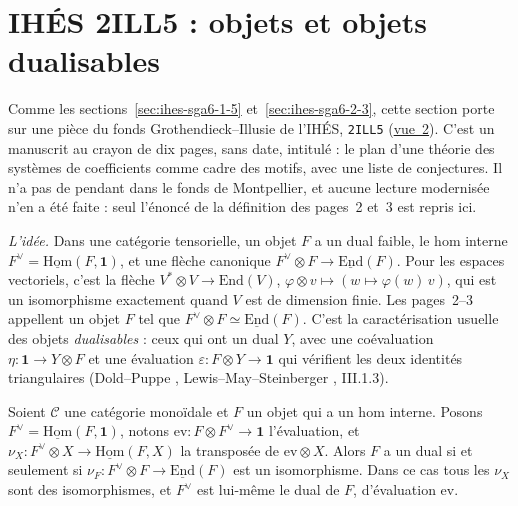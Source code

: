 \section[IHÉS 2ILL5 : objets \q{sereins} et objets dualisables]{IHÉS 2ILL5 : objets  et objets dualisables\protect{}}\label{sec:ihes-2ill5}

Comme les sections~\ref{sec:ihes-sga6-1-5} et~\ref{sec:ihes-sga6-2-3}, cette section porte sur une pièce du fonds Grothendieck--Illusie de l'IHÉS, \texttt{2ILL5} (\href{https://grothendieck.commutator.io/illusie/\#2ILL5/1/p2}{vue~2}). C'est un manuscrit au crayon de dix pages, sans date, intitulé  : le plan d'une théorie des systèmes de coefficients comme cadre des motifs, avec une liste de conjectures. Il n'a pas de pendant dans le fonds de Montpellier, et aucune lecture modernisée n'en a été faite : seul l'énoncé de la définition des pages~2 et~3 est repris ici.

\emph{L'idée.} Dans une catégorie tensorielle, un objet $F$ a un dual faible, le hom interne $F^\vee = \underline{\mathrm{Hom}}(F, \mathbf 1)$, et une flèche canonique $F^\vee \otimes F \to \underline{\mathrm{End}}(F)$. Pour les espaces vectoriels, c'est la flèche $V^* \otimes V \to \mathrm{End}(V)$, $\varphi \otimes v \mapsto (w \mapsto \varphi(w)\,v)$, qui est un isomorphisme exactement quand $V$ est de dimension finie. Les pages~2--3 appellent  un objet $F$ tel que $F^\vee \otimes F \simeq \underline{\mathrm{End}}(F)$. C'est la caractérisation usuelle des objets \emph{dualisables} : ceux qui ont un dual $Y$, avec une coévaluation $\eta : \mathbf 1 \to Y \otimes F$ et une évaluation $\varepsilon : F \otimes Y \to \mathbf 1$ qui vérifient les deux identités triangulaires (Dold--Puppe \cite{doldpuppe1980}, Lewis--May--Steinberger \cite{lms1986}, III.1.3).

\begin{encadre}
\begin{enonce}[Manuscrit, pp.~2--3]
Soient $\mathcal C$ une catégorie monoïdale et $F$ un objet qui a un hom interne. Posons $F^\vee = \underline{\mathrm{Hom}}(F, \mathbf 1)$, notons $\mathrm{ev} : F \otimes F^\vee \to \mathbf 1$ l'évaluation, et $\nu_X : F^\vee \otimes X \to \underline{\mathrm{Hom}}(F, X)$ la transposée de $\mathrm{ev} \otimes X$. Alors $F$ a un dual si et seulement si $\nu_F : F^\vee \otimes F \to \underline{\mathrm{End}}(F)$ est un isomorphisme. Dans ce cas tous les $\nu_X$ sont des isomorphismes, et $F^\vee$ est lui-même le dual de $F$, d'évaluation $\mathrm{ev}$.
\end{enonce}
\end{encadre}

